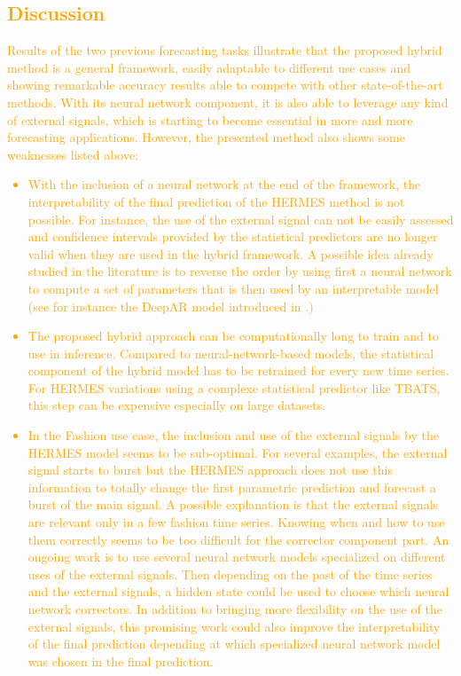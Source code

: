 \documentclass[10pt]{article} %
\begin{document}
\textcolor{orange}{
\subsection{Discussion}
Results of the two previous forecasting tasks illustrate that the proposed hybrid method is a general framework, easily adaptable to different use cases and showing remarkable accuracy results able to compete with other state-of-the-art methods. With its neural network component, it is also able to leverage any kind of external signals, which is starting to become essential in more and more forecasting applications. However, the presented method also shows some weaknesses listed above:
\begin{itemize}
\item With the inclusion of a neural network at the end of the framework, the interpretability of the final prediction of the HERMES method is not possible. For instance, the use of the external signal can not be easily assessed and confidence intervals provided by the statistical predictors are no longer valid when they are used in the hybrid framework. A possible idea already studied in the literature is to reverse the order by using first a neural network to compute a set of parameters that is then used by an interpretable model (see for instance the DeepAR model introduced in \cite{salinas2020}.)
\item The proposed hybrid approach can be computationally long to train and to use in inference. Compared to neural-network-based models, the statistical component of the hybrid model has to be retrained for every new time series. For HERMES variations using a complexe statistical predictor like TBATS, this step can be expensive especially on large datasets.
\item In the Fashion use case, the inclusion and use of the external signals by the HERMES model seems to be sub-optimal. For several examples, the external signal starts to burst but the HERMES approach does not use this information to totally change the first parametric prediction and forecast a burst of the main signal. A possible explanation is that the external signals are relevant only in a few fashion time series. Knowing when and how to use them correctly seems to be too difficult for the corrector component part. An ongoing work is to use several neural network models specialized on different uses of the external signals. Then depending on the past of the time series and the external signals, a hidden state could be used to choose which neural network correctors. In addition to bringing more flexibility on the use of the external signals, this promising work could also improve the interpretability of the final prediction depending at which specialized neural network model was chosen in the final prediction.
\end{itemize}
}
\end{document}
